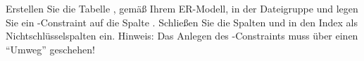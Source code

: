 \item Erstellen Sie die Tabelle , gemäß Ihrem ER-Modell,
in der Dateigruppe  und legen Sie ein \UNIQUE-Constraint auf die
Spalte . Schließen Sie die Spalten  und
 in den Index als Nichtschlüsselspalten ein. Hinweis: Das
Anlegen des \UNIQUE-Constraints muss über einen \enquote{Umweg} geschehen!
